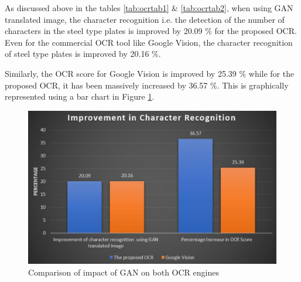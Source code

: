	As discussed above in the tables \ref{tab:ocrtab1} \& \ref{tab:ocrtab2}, when using GAN translated image, the character recognition i.e. the detection of the number of characters in the steel type plates is improved by 20.09 \% for the proposed OCR. Even for the commercial OCR tool like Google Vision, the character recognition of steel type plates is improved by 20.16 \%. 
\begin{table}[H]
\caption{Comparison of impact of GAN on both OCR engines}
\label{tab:ocrtab3}
\end{table}

Similarly, the OCR score for Google Vision is improved by 25.39 \% while for the proposed OCR, it has been massively increased by 36.57 \%. This is graphically represented using a bar chart in Figure \ref{fig:ocrcomp5}.


\begin{figure}[H]
\centering
\includegraphics[width=5in]{images/ocrcomp5.eps}
\caption{Comparison of impact of GAN on both OCR engines}
\label{fig:ocrcomp5}
\end{figure}
